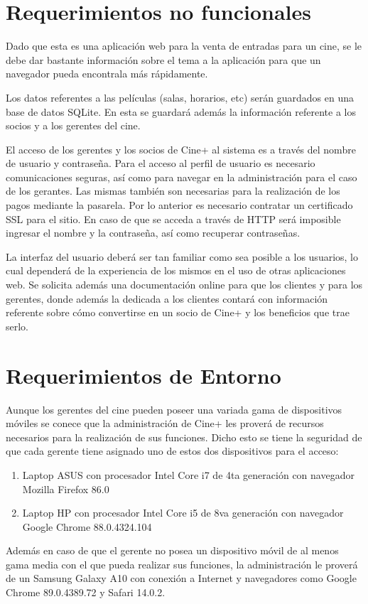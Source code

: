 \section{Requerimientos no funcionales}

Dado que esta es una aplicación web para la venta de entradas para un cine, se le debe dar bastante información sobre el tema a la aplicación para que un navegador pueda encontrala más rápidamente.

Los datos referentes a las películas (salas, horarios, etc) serán guardados en una base de datos SQLite. En esta se guardará además la información referente a los socios y a los gerentes del cine.

El acceso de los gerentes y los socios de Cine+ al sistema es a través del nombre de usuario y contraseña. Para el acceso al perfil de usuario es necesario comunicaciones seguras, así como para navegar en la administración para el caso de los gerantes. Las mismas también son necesarias para la realización de los pagos mediante la pasarela. Por lo anterior es necesario contratar un certificado SSL para el sitio. En caso de que se acceda a través de HTTP será imposible ingresar  el nombre y la contraseña, así como recuperar contraseñas.

La interfaz del usuario deberá ser tan familiar como sea posible a los usuarios, lo cual dependerá de la experiencia de los mismos en el uso de otras aplicaciones web. Se solicita además una documentación online para que los clientes y para los gerentes, donde además la dedicada a los clientes contará con información referente sobre cómo convertirse en un socio de Cine+ y los beneficios que trae serlo.

\section{Requerimientos de Entorno}

Aunque los gerentes del cine pueden poseer una variada gama de dispositivos móviles se conece que la administración de Cine+ les proverá de recursos necesarios para la realización de sus funciones. Dicho esto se tiene la seguridad de que cada gerente tiene asignado uno de estos dos dispositivos para el acceso:

\begin{enumerate}
    \item Laptop ASUS con procesador Intel Core i7 de 4ta generación con navegador Mozilla Firefox 86.0
    \item Laptop HP con procesador Intel Core i5 de 8va generación con navegador Google Chrome 88.0.4324.104
\end{enumerate}
Además en caso de que el gerente no posea un dispositivo móvil de al menos gama media con el que pueda realizar sus funciones, la administración le proverá de un Samsung Galaxy A10 con conexión a Internet y navegadores como Google Chrome 89.0.4389.72 y Safari 14.0.2. 

